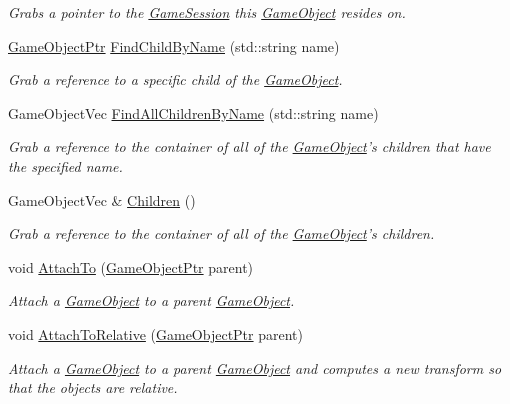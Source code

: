 \begin{DoxyCompactItemize}
\begin{DoxyCompactList}\small\item\em Grabs a pointer to the \hyperlink{classDCEngine_1_1GameSession}{Game\-Session} this \hyperlink{classDCEngine_1_1GameObject}{Game\-Object} resides on. \end{DoxyCompactList}\item 
\hyperlink{classDCEngine_1_1GameObject}{Game\-Object\-Ptr} \hyperlink{classDCEngine_1_1GameObject_a6b3783fd91fd5f7fd44ffe29b5205a87}{Find\-Child\-By\-Name} (std\-::string name)
\begin{DoxyCompactList}\small\item\em Grab a reference to a specific child of the \hyperlink{classDCEngine_1_1GameObject}{Game\-Object}. \end{DoxyCompactList}\item 
Game\-Object\-Vec \hyperlink{classDCEngine_1_1GameObject_a312b2539d0b52daa8ad421cccefcc8b7}{Find\-All\-Children\-By\-Name} (std\-::string name)
\begin{DoxyCompactList}\small\item\em Grab a reference to the container of all of the \hyperlink{classDCEngine_1_1GameObject}{Game\-Object}'s children that have the specified name. \end{DoxyCompactList}\item 
Game\-Object\-Vec \& \hyperlink{classDCEngine_1_1GameObject_a3a933b7b073cc210a8d170103cb5f85e}{Children} ()
\begin{DoxyCompactList}\small\item\em Grab a reference to the container of all of the \hyperlink{classDCEngine_1_1GameObject}{Game\-Object}'s children. \end{DoxyCompactList}\item 
void \hyperlink{classDCEngine_1_1GameObject_ae2a505c62a9724b6442e53a6c90e401d}{Attach\-To} (\hyperlink{classDCEngine_1_1GameObject}{Game\-Object\-Ptr} parent)
\begin{DoxyCompactList}\small\item\em Attach a \hyperlink{classDCEngine_1_1GameObject}{Game\-Object} to a parent \hyperlink{classDCEngine_1_1GameObject}{Game\-Object}. \end{DoxyCompactList}\item 
void \hyperlink{classDCEngine_1_1GameObject_ac871b9774ba28ab7a6520c9df41c5d46}{Attach\-To\-Relative} (\hyperlink{classDCEngine_1_1GameObject}{Game\-Object\-Ptr} parent)
\begin{DoxyCompactList}\small\item\em Attach a \hyperlink{classDCEngine_1_1GameObject}{Game\-Object} to a parent \hyperlink{classDCEngine_1_1GameObject}{Game\-Object} and computes a new transform so that the objects are relative. \end{DoxyCompactList}\item 

\end{DoxyCompactItemize}

